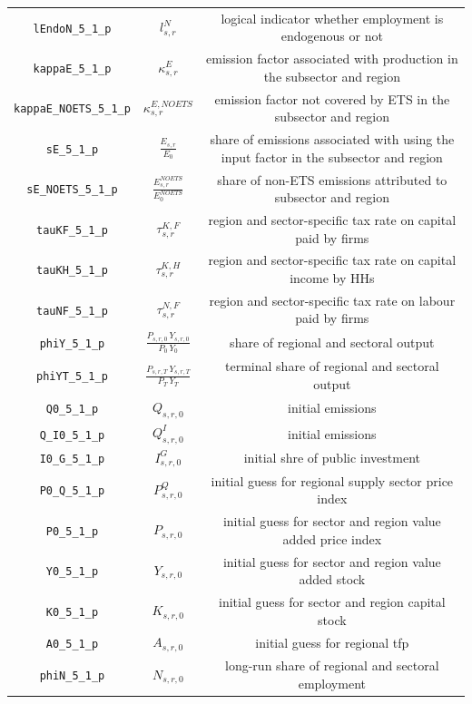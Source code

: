 \begin{center}
\begin{longtable}{ccc}
\texttt{lEndoN\_5\_1\_p} & ${l^{N}_{s,r}}$ & logical indicator whether employment is endogenous or not\\
\texttt{kappaE\_5\_1\_p} & ${\kappa^{E}_{s,r}}$ & emission factor associated with production in the subsector and region\\
\texttt{kappaE\_NOETS\_5\_1\_p} & ${\kappa^{E,NOETS}_{s,r}}$ & emission factor not covered by ETS in the subsector and region\\
\texttt{sE\_5\_1\_p} & ${\frac{E_{s,r}}{E_0}}$ & share of emissions associated with using the input factor in the subsector and region\\
\texttt{sE\_NOETS\_5\_1\_p} & ${\frac{E^{NOETS}_{s,r}}{E^{NOETS}_0}}$ & share of non-ETS emissions attributed to subsector and region\\
\texttt{tauKF\_5\_1\_p} & ${\tau^{K,F}_{s,r}}$ & region and sector-specific tax rate on capital paid by firms\\
\texttt{tauKH\_5\_1\_p} & ${\tau^{K,H}_{s,r}}$ & region and sector-specific tax rate on capital income by HHs\\
\texttt{tauNF\_5\_1\_p} & ${\tau^{N,F}_{s,r}}$ & region and sector-specific tax rate on labour paid by firms\\
\texttt{phiY\_5\_1\_p} & $\frac{P_{s,r,0} \, Y_{s,r,0}}{P_{0} \, Y_{0}}$ & share of regional and sectoral output\\
\texttt{phiYT\_5\_1\_p} & $\frac{P_{s,r,T} \, Y_{s,r,T}}{P_{T} \, Y_{T}}$ & terminal share of regional and sectoral output\\
\texttt{Q0\_5\_1\_p} & ${Q_{s,r,0}}$ & initial emissions\\
\texttt{Q\_I0\_5\_1\_p} & ${Q^I_{s,r,0}}$ & initial emissions\\
\texttt{I0\_G\_5\_1\_p} & ${I^G_{s,r,0}}$ & initial shre of public investment\\
\texttt{P0\_Q\_5\_1\_p} & ${P^Q_{s,r,0}}$ & initial guess for regional supply sector price index\\
\texttt{P0\_5\_1\_p} & ${P_{s,r,0}}$ & initial guess for sector and region value added price index\\
\texttt{Y0\_5\_1\_p} & ${Y_{s,r,0}}$ & initial guess for sector and region value added stock\\
\texttt{K0\_5\_1\_p} & ${K_{s,r,0}}$ & initial guess for sector and region capital stock\\
\texttt{A0\_5\_1\_p} & ${A_{s,r,0}}$ & initial guess for regional tfp\\
\texttt{phiN\_5\_1\_p} & ${N_{s,r,0}}$ & long-run share of regional and sectoral employment\\

\end{longtable}
\end{center}
